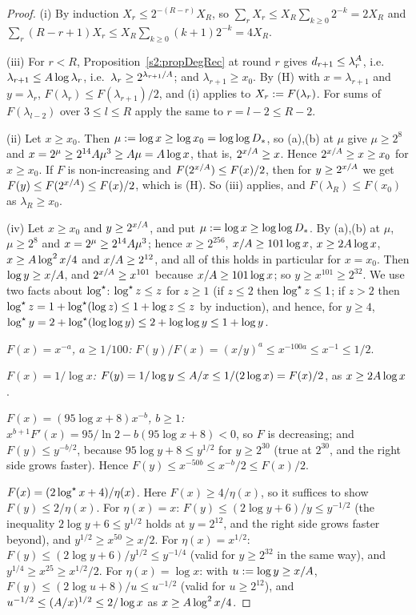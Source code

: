 \begin{proof}
(i) By induction $X_r\le2^{-(R-r)}X_R$, so $\sum_rX_r\le X_R\sum_{k\ge0}2^{-k}
=2X_R$ and $\sum_r(R-r+1)X_r\le X_R\sum_{k\ge0}(k+1)2^{-k}=4X_R$.

(iii) For $r<R$, Proposition~\ref{s2:propDegRec} at round $r$ gives
$d_{r+1}\le\lambda_r^{A}$, i.e.\ $\lambda_{r+1}\le A\log\lambda_r$,
i.e.\ $\lambda_r\ge2^{\lambda_{r+1}/A}$; and $\lambda_{r+1}\ge x_0$. By (H)
with $x=\lambda_{r+1}$ and $y=\lambda_r$, $F(\lambda_r)\le F(\lambda_{r+1})/2$,
and (i) applies to $X_r\mathrel{:=} F(\lambda_r)$. For sums of $F(\lambda_{l-2})$
over $3\le l\le R$ apply the same to $r=l-2\le R-2$.

(ii) Let $x\ge x_0$. Then $\mu\mathrel{:=}\log x\ge\log x_0=\log\log D_{*}$, so (a),(b)
at $\mu$ give $\mu\ge2^8$ and $x=2^\mu\ge2^{14}A\mu^3\ge A\mu=A\log x$, that is,
$2^{x/A}\ge x$. Hence $2^{x/A}\ge x\ge x_0$ for $x\ge x_0$.
If $F$ is non-increasing and $F(2^{x/A})\le F(x)/2$, then for $y\ge
2^{x/A}$ we get $F(y)\le F(2^{x/A})\le F(x)/2$, which is (H). So (iii)
applies, and $F(\lambda_R)\le F(x_0)$ as $\lambda_R\ge x_0$.

(iv) Let $x\ge x_0$ and $y\ge2^{x/A}$, and put $\mu\mathrel{:=}\log x\ge\log\log D_{*}$.
By (a),(b) at $\mu$, $\mu\ge2^8$ and $x=2^\mu\ge2^{14}A\mu^3$; hence
$x\ge2^{256}$, $x/A\ge101\log x$, $x\ge2A\log x$, $x\ge A\log^2x/4$ and
$x/A\ge2^{12}$, and all of this holds in particular for $x=x_0$. Then
$\log y\ge x/A$, and $2^{x/A}\ge x^{101}$ because $x/A\ge101\log x$; so
$y\ge x^{101}\ge2^{32}$.
We use two facts about $\log^{\star}$: $\log^{\star} z\le z$ for $z\ge1$ (if $z\le2$ then
$\log^{\star} z\le1$; if $z>2$ then $\log^{\star} z=1+\log^{\star}(\log z)\le1+\log z\le z$ by
induction), and hence, for $y\ge4$, $\log^{\star} y=2+\log^{\star}(\log\log y)\le2+\log\log y
\le1+\log y$.

\emph{$F(x)=x^{-a}$, $a\ge1/100$:} $F(y)/F(x)=(x/y)^a\le x^{-100a}\le x^{-1}\le
1/2$.

\emph{$F(x)=1/\log x$:} $F(y)=1/\log y\le A/x\le1/(2\log x)=F(x)/2$, as
$x\ge2A\log x$.

\emph{$F(x)=(95\log x+8)x^{-b}$, $b\ge1$:} $x^{b+1}F'(x)=95/\ln2-b(95\log x+8)
<0$, so $F$ is decreasing; and $F(y)\le y^{-b/2}$, because $95\log y+8\le
y^{1/2}$ for $y\ge2^{30}$ (true at $2^{30}$, and the right side grows faster).
Hence $F(y)\le x^{-50b}\le x^{-b}/2\le F(x)/2$.

\emph{$F(x)=(2\log^{\star} x+4)/\eta(x)$.} Here $F(x)\ge4/\eta(x)$, so it suffices to
show $F(y)\le2/\eta(x)$. For $\eta(x)=x$: $F(y)\le(2\log y+6)/y\le y^{-1/2}$
(the inequality $2\log y+6\le y^{1/2}$ holds at $y=2^{12}$, and the right side
grows faster beyond), and $y^{1/2}\ge x^{50}\ge x/2$. For $\eta(x)=x^{1/2}$:
$F(y)\le(2\log y+6)/y^{1/2}\le y^{-1/4}$ (valid for $y\ge2^{32}$ in the same
way), and $y^{1/4}\ge x^{25}\ge x^{1/2}/2$. For $\eta(x)=\log x$: with
$u\mathrel{:=}\log y\ge x/A$, $F(y)\le(2\log u+8)/u\le u^{-1/2}$ (valid for $u\ge
2^{12}$), and $u^{-1/2}\le(A/x)^{1/2}\le2/\log x$ as $x\ge A\log^2x/4$.


\end{proof}
